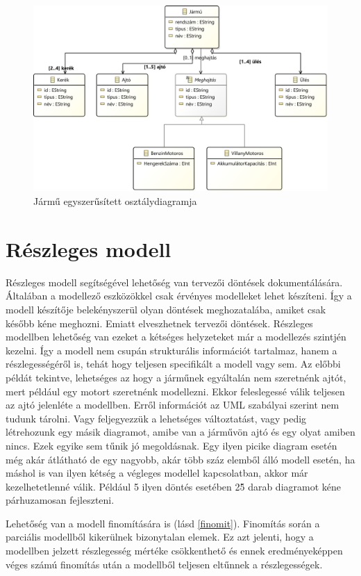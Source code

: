 \begin{figure}[!ht]
	\centering
	\includegraphics[width=130mm]{figures/vehicle.pdf}
	\caption{Jármű egyszerűsített osztálydiagramja} 
	\label{jarmu}
\end{figure}

\section{Részleges modell}
Részleges modell segítségével lehetőség van tervezői döntések dokumentálására. Általában a modellező eszközökkel csak érvényes modelleket lehet készíteni. Így a modell készítője belekényszerül olyan döntések meghozatalába, amiket csak később kéne meghozni. Emiatt elveszhetnek tervezői döntések. Részleges modellben lehetőség van ezeket a kétséges helyzeteket már a modellezés szintjén kezelni. Így a modell nem csupán strukturális információt tartalmaz, hanem a részlegességéről is, tehát hogy teljesen specifikált a modell vagy sem. Az előbbi példát tekintve, lehetséges az hogy a járműnek egyáltalán nem szeretnénk ajtót, mert például egy motort szeretnénk modellezni. Ekkor feleslegessé válik teljesen az ajtó jelenléte a modellben. Erről információt az UML szabályai szerint nem tudunk tárolni. Vagy feljegyezzük a lehetséges változtatást, vagy pedig létrehozunk egy másik diagramot, amibe van a járművön ajtó és egy olyat amiben nincs. Ezek egyike sem tűnik jó megoldásnak. Egy ilyen picike diagram esetén még akár átlátható de egy nagyobb, akár több száz elemből álló modell esetén, ha máshol is van ilyen kétség a végleges modellel kapcsolatban, akkor már kezelhetetlenné válik. Például 5 ilyen döntés esetében 2\^5 darab diagramot kéne párhuzamosan fejleszteni.
\par
Lehetőség van a modell finomítására is (lásd \autoref{finomit}). Finomítás során a parciális modellből kikerülnek bizonytalan elemek. Ez azt jelenti, hogy a modellben jelzett részlegesség mértéke csökkenthető és ennek eredményeképpen véges számú finomítás után a modellből teljesen eltűnnek a részlegességek.

